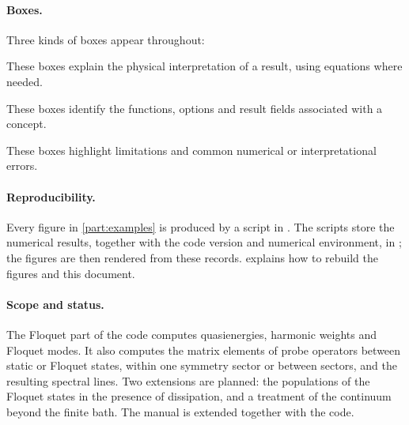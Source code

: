 \paragraph{Boxes.}
Three kinds of boxes appear throughout:

\begin{physics}
These boxes explain the physical interpretation of a result, using equations where needed.
\end{physics}
\begin{incode}
These boxes identify the functions, options and result fields associated with a concept.
\end{incode}
\begin{caution}
These boxes highlight limitations and common numerical or interpretational errors.
\end{caution}

\paragraph{Reproducibility.}
Every figure in \cref{part:examples} is produced by a script in
. The scripts store the numerical results, together with the
code version and numerical environment, in ; the figures are then
rendered from these records.  explains how to rebuild the figures and
this document.

\paragraph{Scope and status.}
The Floquet part of the code computes quasienergies, harmonic weights and Floquet modes. It
also computes the matrix elements of probe operators between static or Floquet states,
within one symmetry sector or between sectors, and the resulting spectral lines. Two
extensions are planned: the populations of the Floquet states in the presence of
dissipation, and a treatment of the continuum beyond the finite bath. The manual is
extended together with the code.

